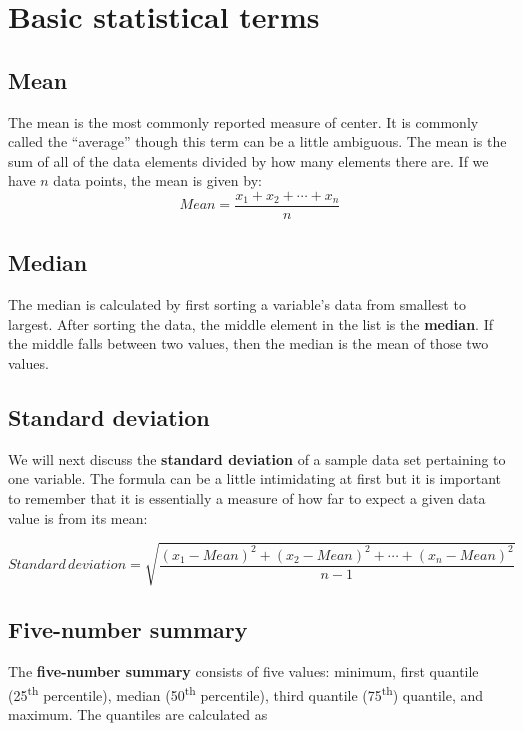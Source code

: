 \documentclass[]{tufte-book}
\begin{document}
\section{Basic statistical terms}\label{basic-statistical-terms}

\subsection{Mean}\label{mean}

The mean is the most commonly reported measure of center. It is commonly
called the ``average'' though this term can be a little ambiguous. The
mean is the sum of all of the data elements divided by how many elements
there are. If we have \(n\) data points, the mean is given by:
\[Mean = \frac{x_1 + x_2 + \cdots + x_n}{n}\]

\subsection{Median}\label{median}

The median is calculated by first sorting a variable's data from
smallest to largest. After sorting the data, the middle element in the
list is the \textbf{median}. If the middle falls between two values,
then the median is the mean of those two values.

\subsection{Standard deviation}\label{standard-deviation}

We will next discuss the \textbf{standard deviation} of a sample data
set pertaining to one variable. The formula can be a little intimidating
at first but it is important to remember that it is essentially a
measure of how far to expect a given data value is from its mean:

\[Standard \, deviation = \sqrt{\frac{(x_1 - Mean)^2 + (x_2 - Mean)^2 + \cdots + (x_n - Mean)^2}{n - 1}}\]

\subsection{Five-number summary}\label{five-number-summary}

The \textbf{five-number summary} consists of five values: minimum, first
quantile (25\textsuperscript{th} percentile), median
(50\textsuperscript{th} percentile), third quantile
(75\textsuperscript{th}) quantile, and maximum. The quantiles are
calculated as
\end{document}
